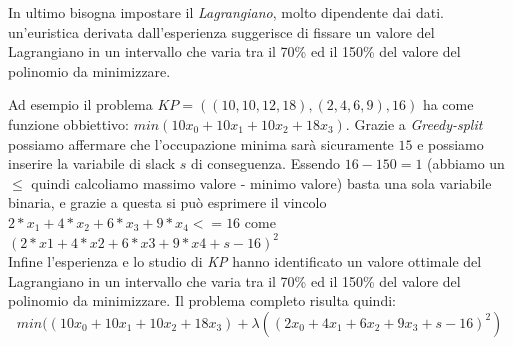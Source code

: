\documentclass[a4paper]{article}
\begin{document}
In ultimo bisogna impostare il \textit{Lagrangiano}, molto dipendente dai dati. un'euristica derivata dall'esperienza suggerisce di fissare un valore del Lagrangiano in un intervallo che varia tra il 70\% ed il 150\% del valore del polinomio da minimizzare.

Ad esempio il problema $KP = ((10,10,12,18),(2,4,6,9),16)$ ha come funzione obbiettivo: $min(10x_0 + 10x_1 + 10x_2 + 18x_3)$.
Grazie a \textit{Greedy-split} possiamo affermare che l'occupazione minima sarà sicuramente $15$ e possiamo inserire la variabile di slack $s$ di conseguenza.
Essendo $16 - 150 = 1$ (abbiamo un $\leq$ quindi calcoliamo massimo valore - minimo valore) basta una sola variabile binaria, e grazie a questa si può esprimere il vincolo $2*x_1 +4*x_2 +6*x_3 +9*x_4 <= 16$ come $(2*x1 + 4*x2 +6*x3 +9*x4 + s -16)^2 $\\ %
Infine l'esperienza e lo studio di \emph{KP} hanno identificato un valore ottimale del Lagrangiano in un intervallo che varia tra il 70\% ed il 150\% del valore del polinomio da minimizzare.
Il problema completo risulta quindi: $$ min((10x_0 + 10x_1 + 10x_2 + 18x_3) + \lambda  ((2x_0 + 4x_1 +6x_2 +9x_3 + s -16 )^2)$$
\end{document}
